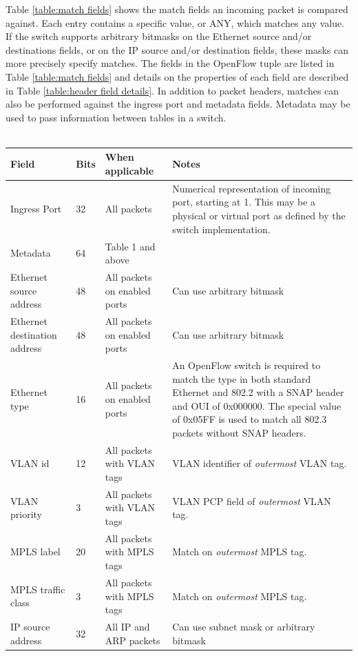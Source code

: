 \documentclass[10pt]{article}
\begin{document}
Table \ref{table:match fields} shows the match fields an incoming packet is compared against. Each entry contains a specific value, or ANY, which matches any value. If the switch supports arbitrary bitmasks on the Ethernet source and/or destinations fields, or on the IP source and/or destination fields, these masks can more precisely specify matches.  The fields in the OpenFlow tuple are listed in Table \ref{table:match fields} and details on the properties of each field are described in Table \ref{table:header field details}. In addition to packet headers, matches can also be performed against the ingress port and metadata fields. Metadata may be used to pass information between tables in a switch.
\\\\
\begin{table}[hbp]
\centering
\footnotesize
\begin{tabularx}{\textwidth}{ |X|X|X|X| }
\hline Field & Bits & When applicable & Notes \\
\hline Ingress Port & 32 & All packets & Numerical representation of incoming port, starting at 1. This may be a physical or virtual port as defined by the switch implementation. \\
\hline Metadata & 64 & Table 1 and above & \\
\hline Ethernet source address & 48 & All packets on enabled ports & Can use arbitrary bitmask \\
\hline Ethernet destination address & 48 & All packets on enabled ports & Can use arbitrary bitmask \\
\hline Ethernet type & 16 & All packets on enabled ports & An OpenFlow switch is required to match the type in both standard Ethernet and 802.2 with a SNAP header and OUI of 0x000000.  The special value of 0x05FF is used to match all 802.3 packets without SNAP headers. \\
\hline VLAN id & 12 & All packets with VLAN tags & VLAN identifier of \emph{outermost} VLAN tag. \\
\hline VLAN priority & 3 & All packets with VLAN tags & VLAN PCP field of \emph{outermost} VLAN tag. \\
\hline MPLS label & 20 & All packets with MPLS tags & Match on \emph{outermost} MPLS tag. \\
\hline MPLS traffic class & 3 & All packets with MPLS tags & Match on \emph{outermost} MPLS tag. \\
\hline IP source address & 32 & All IP and ARP packets & Can use subnet mask or arbitrary bitmask \\

\end{tabularx}
\end{table}
\end{document}
